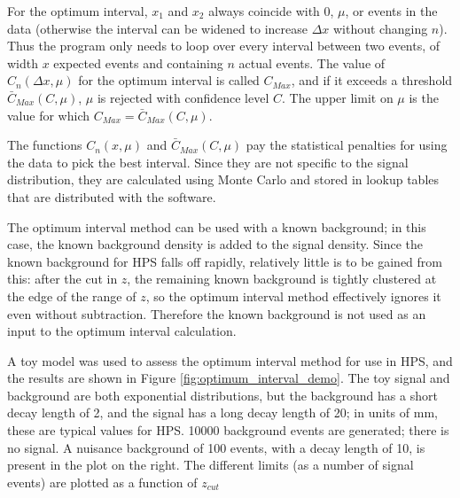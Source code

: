 For the optimum interval, $x_1$ and $x_2$ always coincide with 0, $\mu$, or events in the data (otherwise the interval can be widened to increase $\Delta x$ without changing $n$).
Thus the program only needs to loop over every interval between two events, of width $x$ expected events and containing $n$ actual events.
The value of $C_n(\Delta x,\mu)$ for the optimum interval is called $C_{Max}$, and if it exceeds a threshold $\bar{C}_{Max}(C,\mu)$, $\mu$ is rejected with confidence level $C$.
The upper limit on $\mu$ is the value for which $C_{Max}=\bar{C}_{Max}(C,\mu)$.


The functions $C_n(x,\mu)$ and $\bar{C}_{Max}(C,\mu)$ pay the statistical penalties for using the data to pick the best interval.
Since they are not specific to the signal distribution, they are calculated using Monte Carlo and stored in lookup tables that are distributed with the software.

The optimum interval method can be used with a known background; in this case, the known background density is added to the signal density.
Since the known background for HPS falls off rapidly, relatively little is to be gained from this: after the cut in $z$, the remaining known background is tightly clustered at the edge of the range of $z$, so the optimum interval method effectively ignores it even without subtraction.
Therefore the known background is not used as an input to the optimum interval calculation.

A toy model was used to assess the optimum interval method for use in HPS, and the results are shown in Figure \ref{fig:optimum_interval_demo}.
The toy signal and background are both exponential distributions, but the background has a short decay length of 2, and the signal has a long decay length of 20; in units of mm, these are typical values for HPS.
10000 background events are generated; there is no signal.
A nuisance background of 100 events, with a decay length of 10, is present in the plot on the right.
The different limits (as a number of signal events) are plotted as a function of $z_{cut}$

